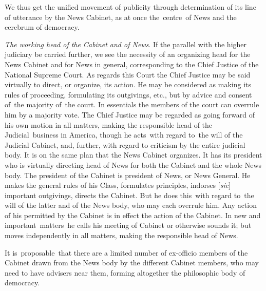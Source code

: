 \documentclass[openany,nobib]{tufte-book}
\begin{document}
We thus get the unified movement of publicity through determination of
its line of utterance by the News Cabinet, as at once the~centre~of News
and the cerebrum of democracy.~

\vspace{0.05in}

\emph{The working head of the Cabinet and of News}. If the parallel with
the higher judiciary be carried further, we see the necessity of an
organizing head for the News Cabinet and for News in general,
corresponding to the Chief Justice of the National Supreme Court. As
regards this Court the Chief Justice may be said virtually to direct, or
organize, its action. He may be considered as making its rules of
proceeding, formulating its outgivings, etc., but by advice and consent
of~the majority of~the court. In essentials the members of the court can
overrule him by a majority vote. The Chief Justice may be regarded as
going forward of his own motion in all matters, making the responsible
head of the Judicial~business in America, though he acts~with regard
to~the will of the Judicial Cabinet, and, further, with regard to
criticism by the entire judicial body. It is on the same plan that the
News Cabinet organizes. It has its president who is virtually directing
head of News for both the Cabinet and the whole News body. The president
of the Cabinet is president of News, or News General. He makes the
general rules of his Class, formulates principles, indorses
{[}\emph{sic}{]} important outgivings, directs the Cabinet. But he does
this~with regard to~the will of the latter and of the News body, who may
each overrule him. Any action of his permitted by the Cabinet is in
effect the action of the Cabinet. In new and important~matters~he calls
his meeting of Cabinet or otherwise sounds it; but moves independently
in all matters, making the responsible head of News.~

It is~proposable~that there are a limited number of ex-officio members
of the Cabinet drawn from the News body by the different Cabinet
members, who may need to have advisers near them, forming altogether the
philosophic body of democracy.~

\vspace{0.05in}
\end{document}
